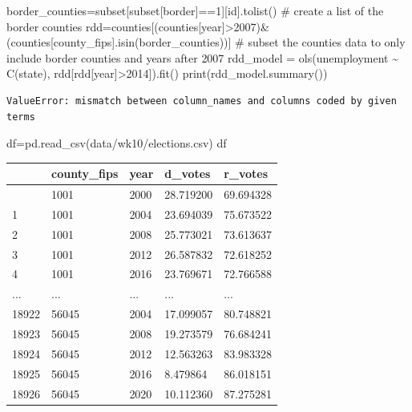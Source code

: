 \documentclass[
  letterpaper,
  DIV=11,
  numbers=noendperiod]{scrreprt}
\newenvironment{Shaded}{\begin{snugshade}}{\end{snugshade}}
\newcommand{\BuiltInTok}[1]{\textcolor[rgb]{0.00,0.23,0.31}{#1}}
\newcommand{\CommentTok}[1]{\textcolor[rgb]{0.37,0.37,0.37}{#1}}
\newcommand{\DecValTok}[1]{\textcolor[rgb]{0.68,0.00,0.00}{#1}}
\newcommand{\NormalTok}[1]{\textcolor[rgb]{0.00,0.23,0.31}{#1}}
\newcommand{\OperatorTok}[1]{\textcolor[rgb]{0.37,0.37,0.37}{#1}}
\newcommand{\StringTok}[1]{\textcolor[rgb]{0.13,0.47,0.30}{#1}}
\begin{document}
\begin{Shaded}
\begin{Highlighting}[]
\NormalTok{border\_counties}\OperatorTok{=}\NormalTok{subset[subset[}\StringTok{\textquotesingle{}border\textquotesingle{}}\NormalTok{]}\OperatorTok{==}\DecValTok{1}\NormalTok{][}\StringTok{\textquotesingle{}id\textquotesingle{}}\NormalTok{].tolist() }\CommentTok{\# create a list of the border counties}
\NormalTok{rdd}\OperatorTok{=}\NormalTok{counties[(counties[}\StringTok{\textquotesingle{}year\textquotesingle{}}\NormalTok{]}\OperatorTok{\textgreater{}}\DecValTok{2007}\NormalTok{)}\OperatorTok{\&}\NormalTok{(counties[}\StringTok{\textquotesingle{}county\_fips\textquotesingle{}}\NormalTok{].isin(border\_counties))] }\CommentTok{\# subset the counties data to only include border counties and years after 2007}
\NormalTok{rdd\_model }\OperatorTok{=}\NormalTok{ ols(}\StringTok{\textquotesingle{}unemployment \textasciitilde{} C(state)\textquotesingle{}}\NormalTok{, rdd[rdd[}\StringTok{\textquotesingle{}year\textquotesingle{}}\NormalTok{]}\OperatorTok{\textgreater{}}\DecValTok{2014}\NormalTok{]).fit()}
\BuiltInTok{print}\NormalTok{(rdd\_model.summary())}
\end{Highlighting}
\end{Shaded}

\begin{verbatim}
ValueError: mismatch between column_names and columns coded by given terms
\end{verbatim}

\begin{Shaded}
\begin{Highlighting}[]
\NormalTok{df}\OperatorTok{=}\NormalTok{pd.read\_csv(}\StringTok{\textquotesingle{}data/wk10/elections.csv\textquotesingle{}}\NormalTok{)}
\NormalTok{df}
\end{Highlighting}
\end{Shaded}

\begin{longtable}[]{@{}lllll@{}}
\toprule\noalign{}
& county\_fips & year & d\_votes & r\_votes \\
\midrule\noalign{}
\endhead
\bottomrule\noalign{}
\endlastfoot
0 & 1001 & 2000 & 28.719200 & 69.694328 \\
1 & 1001 & 2004 & 23.694039 & 75.673522 \\
2 & 1001 & 2008 & 25.773021 & 73.613637 \\
3 & 1001 & 2012 & 26.587832 & 72.618252 \\
4 & 1001 & 2016 & 23.769671 & 72.766588 \\
... & ... & ... & ... & ... \\
18922 & 56045 & 2004 & 17.099057 & 80.748821 \\
18923 & 56045 & 2008 & 19.273579 & 76.684241 \\
18924 & 56045 & 2012 & 12.563263 & 83.983328 \\
18925 & 56045 & 2016 & 8.479864 & 86.018151 \\
18926 & 56045 & 2020 & 10.112360 & 87.275281 \\
\end{longtable}
\end{document}
